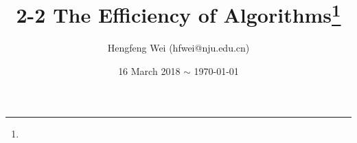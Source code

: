 \documentclass{tufte-handout}
\title{2-2 The Efficiency of Algorithms\thanks{}}
\author[hengxin]{Hengfeng Wei {\normalsize (hfwei@nju.edu.cn)}}
\date{16 March 2018 $\sim$ \today{}}
\begin{document}
\begin{CJK*}{UTF8}{gbsn}

\maketitle








\end{CJK*}
\end{document}
